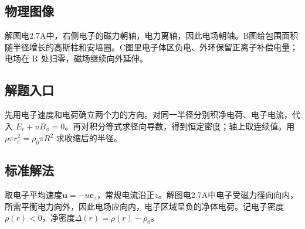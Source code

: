 \documentclass[UTF8,fontset=fandol,a4paper,11pt]{ctexart}
\newcommand{\vect}[1]{\bm{#1}}
\begin{document}


\subsection*{物理图像}

解图电2.7A中，右侧电子的磁力朝轴，电力离轴，因此电场朝轴。B图给包围面积随半径增长的高斯柱和安培圈。C图里电子体区负电、外环保留正离子补偿电量；电场在 R 处归零，磁场继续向外延伸。



\subsection*{解题入口}

先用电子速度和电荷确立两个力的方向。对同一半径分别积净电荷、电子电流，代入 $E_r+uB_\phi=0$。再对积分等式求径向导数，得到恒定密度；轴上取连续值。用 $\rho\pi r_e^2=\rho_0\pi R^2$ 求收缩后的半径。


\subsection*{标准解法}

取电子平均速度$\vect u=-u\vect e_z$，常规电流沿正$z$。解图电2.7A中电子受磁力径向向内，所需平衡电力向外，因此电场应向内，电子区域呈负的净体电荷。记电子密度$\rho(r)<0$，净密度$\Delta(r)=\rho(r)-\rho_0$。
\end{document}
